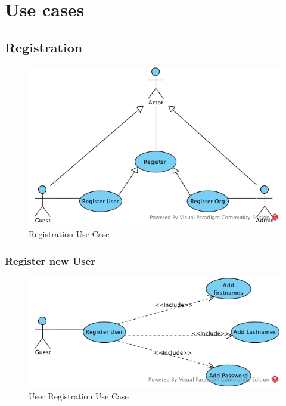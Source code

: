 \section{Use cases}
\label{sec:use-cases}



\subsection{Registration}
\label{sec:register}


\begin{figure}[htpb]
  \centering
  \includegraphics[scale=.75]{figures/UseCaseRegister.png}
  \caption{Registration Use Case}
  \label{fig:usecase-register}
\end{figure}



\subsubsection{Register new User}
\label{sec:register-new-user}

\begin{figure}[htpb]
  \centering
  \includegraphics[scale=.75]{figures/UseCaseRegisterUser.png}
  \caption{User Registration Use Case}
  \label{fig:usecase-register-user}
\end{figure}


